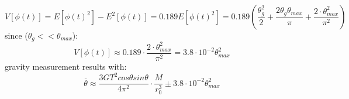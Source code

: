 \documentclass[\main/master.tex]{subfiles}
\begin{document}
\begin{equation}
V[\phi(t)] = E[\phi(t)^2] - E^2[\phi(t)] =0.189 E [\phi(t)^2] = 0.189 (\frac{\theta_g^2}{2} +\frac{2 \theta_g\theta_{max}}{\pi}+\frac{2\cdot \theta_{max}^2}{\pi^2} )
\end{equation}
 since ($\theta_g<<\theta_{max}$):
\begin{equation}
V[\phi(t)] \approx 0.189\cdot \frac{2\cdot \theta_{max}^2}{\pi^2} =  3.8\cdot 10^{-2} \theta_{max}^2
\end{equation}
gravity measurement results with:
\begin{equation}
\overline{\theta}  \approx \frac{3GT^2cos\theta sin\theta}{4\pi^2 } \cdot \frac{M}{r_0^3} \pm 3.8\cdot 10^{-2} \theta_{max}^2 \label{eqn:theta average}
\end{equation} 
\end{document}
